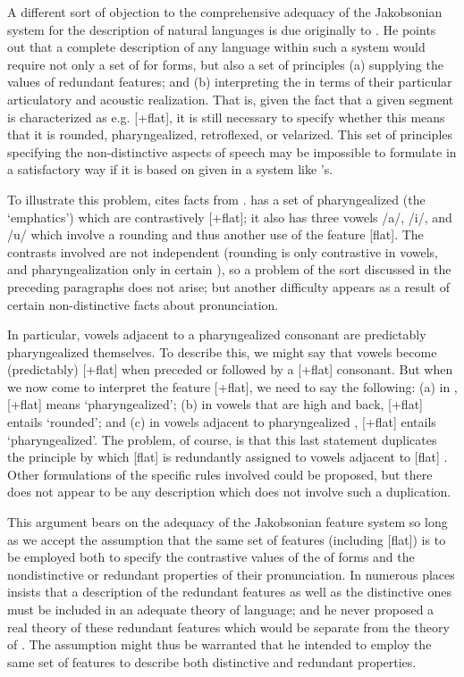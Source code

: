 A different sort of objection to the comprehensive adequacy of the
Jakobsonian system for the description of natural languages is due
originally to \citet{mccawley67:features}. He points out that a
complete description of any language within such a system would
require not only a set of  for forms, but
also a set of principles (a) supplying the values of redundant
features; and (b) interpreting the  in terms of
their particular articulatory and acoustic realization. That is, given
the fact that a given segment is characterized as e.g. [+flat], it is
still necessary to specify whether this means that it is rounded,
pharyngealized, retroflexed, or velarized. This set of principles
specifying the non-distinctive aspects of speech may be impossible to
formulate in a satisfactory way if it is based on 
given in a system like {\Jakobson}'s.

To illustrate this problem, {\McCawley} cites facts from . 
has a set of pharyngealized  (the `emphatics') which are
contrastively [+flat]; it also has three vowels /a/, /i/, and /u/
which involve a rounding  and thus another use of the feature
[flat]. The contrasts involved are not independent (rounding is only
contrastive in vowels, and pharyngealization only in certain
), so a problem of the sort discussed in the preceding
paragraphs does not arise; but another difficulty appears as a result
of certain non-distinctive facts about  pronunciation.

In particular, vowels adjacent to a pharyngealized consonant are
predictably pharyngealized themselves. To describe this, we might say
that vowels become (predictably) [+flat] when preceded or followed by
a [+flat] consonant. But when we now come to interpret the feature
[+flat], we need to say the following: (a) in , [+flat]
means `pharyngealized'; (b) in vowels that are high and back,
[+flat] entails `rounded'; and (c) in vowels adjacent to
pharyngealized , [+flat] entails `pharyngealized'. The
problem, of course, is that this last statement duplicates the
principle by which [flat] is redundantly assigned to vowels adjacent
to [flat] . Other formulations of the specific rules
involved could be proposed, but there does not appear to be any
description which does not involve such a duplication.

This argument bears on the adequacy of the Jakobsonian feature system
so long as we accept the assumption that the same set of features
(including [flat]) is to be employed both to specify the contrastive
values of the  of forms and the
nondistinctive or redundant properties of their pronunciation. In
numerous places {\Jakobson} insists that a description of the redundant
features as well as the distinctive ones must be included in an
adequate theory of language; and he never proposed a real theory of
these redundant features which would be separate from the theory of
. The assumption might thus be warranted that he
intended to employ the same set of features to describe both
distinctive and redundant properties.

